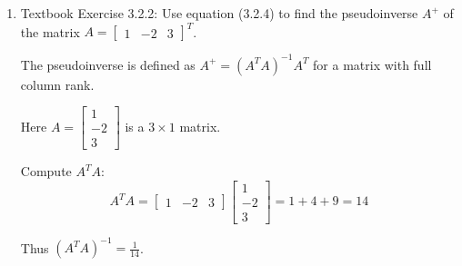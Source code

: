\documentclass[reqno, answers]{exam}
\begin{document}
\begin{enumerate}
\begin{solution}
Now find $(A^T A)^{-1}$. The determinant is $\det(A^T A) = 8 \cdot 6 - (-6)(-6) = 48 - 36 = 12$.
\[
(A^T A)^{-1} = \frac{1}{12} \begin{bmatrix} 6 & 6 \\ 6 & 8 \end{bmatrix} = \begin{bmatrix} 1/2 & 1/2 \\ 1/2 & 2/3 \end{bmatrix}
\]

Finally, compute the solution:
\[
x = (A^T A)^{-1} A^T b = \begin{bmatrix} 1/2 & 1/2 \\ 1/2 & 2/3 \end{bmatrix} \begin{bmatrix} -10 \\ 6 \end{bmatrix} = \begin{bmatrix} -5 + 3 \\ -5 + 4 \end{bmatrix} = \begin{bmatrix} -2 \\ -1 \end{bmatrix}
\]
\end{solution}

\item Textbook Exercise 3.2.2: Use equation (3.2.4) to find the pseudoinverse $A^+$ of the matrix $A = \begin{bmatrix} 1 & -2 & 3 \end{bmatrix}^T$.

\begin{solution}
The pseudoinverse is defined as $A^+ = (A^T A)^{-1} A^T$ for a matrix with full column rank.

Here $A = \begin{bmatrix} 1 \\ -2 \\ 3 \end{bmatrix}$ is a $3 \times 1$ matrix.

Compute $A^T A$:
\[
A^T A = \begin{bmatrix} 1 & -2 & 3 \end{bmatrix} \begin{bmatrix} 1 \\ -2 \\ 3 \end{bmatrix} = 1 + 4 + 9 = 14
\]

Thus $(A^T A)^{-1} = \frac{1}{14}$.


\end{solution}
\end{enumerate}
\end{document}
